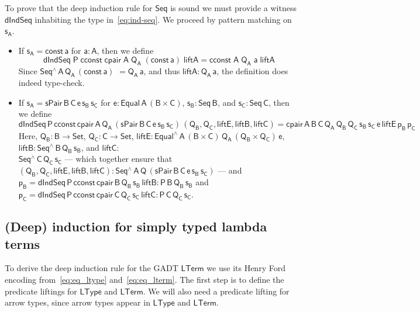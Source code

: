 \documentclass[9pt]{entcs}
\begin{document}
To prove that the deep induction rule for $\mathsf{Seq}$ is sound we
must provide a witness $\mathsf{dIndSeq}$ inhabiting the type
in~\eqref{eq:ind-seq}. We proceed by pattern matching on
$\mathsf{s_A}$.
\begin{itemize}
\item If $\mathsf{s_A = const\,a}$ for $\mathsf{a : A}$, then we
  define \[\mathsf{dIndSeq\;P\;cconst\;cpair\;A\;Q_A\;(const\,a)\;liftA
    = cconst\;A\;Q_A\;a\;liftA}\] Since
  $\mathsf{Seq^{\wedge}\,A\,Q_A\,(const\,a)}$ $\mathsf{= Q_A\,a}$, and
  thus $\mathsf{liftA : Q_A\,a}$, the definition does indeed
  type-check.
\item If $\mathsf{s_A = sPair\,B\,C\,e\,s_B\,s_C}$ for $\mathsf{e :
  Equal\,A\,(B \times C)}$, $\mathsf{s_B : Seq\,B}$, and $\mathsf{s_C
  : Seq\,C}$, then we define
  \[\mathsf{dIndSeq\,P\,cconst\,cpair\,A\,Q_A\,(sPair\,B\,C\,e\,s_B\,s_C)\,
    (Q_B,Q_C, liftE, liftB, liftC) =
    cpair\,A\,B\,C\,Q_A\,Q_B\,Q_C\,s_B\,s_C\,e\,liftE\,p_B\,p_C}\]
  Here, $\mathsf{Q_B : B \to Set}$, $\mathsf{Q_C : C \to Set}$,
  $\mathsf{liftE : Equal^{\wedge}\,A\, (B \times C)\, Q_A\, (Q_B
    \times Q_C) \, e}$, $\mathsf{liftB : Seq^{\wedge}\,B\,Q_B\,s_B}$,
  and $\mathsf{liftC :}$\\
\noindent
$\mathsf{Seq^{\wedge}\,C\,Q_C\,s_C}$ --- which together ensure that
  $\mathsf{(Q_B, Q_C, liftE, liftB, liftC) :
    Seq^{\wedge}\,A\,Q\,(sPair\,B\,C\,e\,s_B\,s_C)}$ --- and\\
$\mathsf{p_B}
  =\mathsf{dIndSeq\,P\,cconst\,cpair\,B\,Q_B\,s_B\,liftB :
    P\,B\,Q_B\,s_B}$ and $\mathsf{p_C}
  =\mathsf{dIndSeq\,P\,cconst\,cpair\,C\,Q_C\,s_C\,liftC :
    P\,C\,Q_C\,s_C}$.
\end{itemize}

\subsection{(Deep) induction for simply typed lambda
  terms}\label{sec:ind-lam} 

To derive the deep induction rule for the GADT $\mathsf{LTerm}$ we use
its Henry Ford encoding from~\ref{eq:eq_ltype}
and~\eqref{eq:eq_lterm}. The first step is to define the predicate
liftings for $\mathsf{LType}$ and $\mathsf{LTerm}$. We will also need
a predicate lifting for arrow types, since arrow types appear in
$\mathsf{LType}$ and $\mathsf{LTerm}$.
\end{document}
